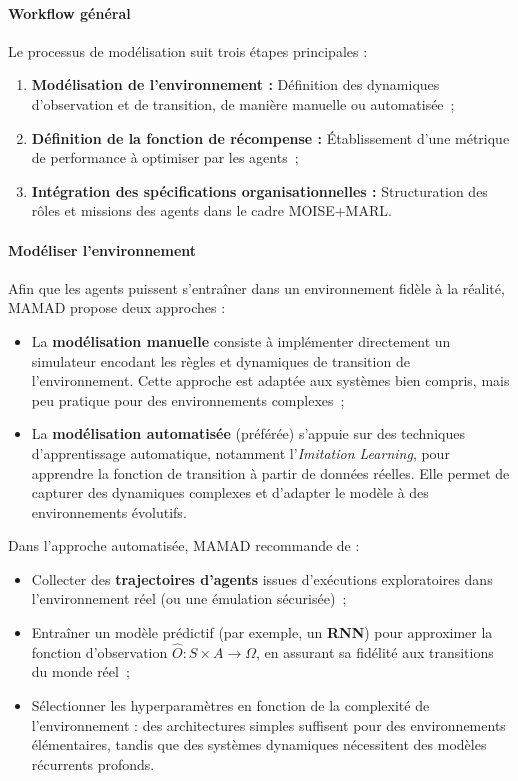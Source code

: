 \paragraph{Workflow général}

Le processus de modélisation suit trois étapes principales :
\begin{enumerate}
    \item \textbf{Modélisation de l'environnement :} Définition des dynamiques d'observation et de transition, de manière manuelle ou automatisée~;
    \item \textbf{Définition de la fonction de récompense :} Établissement d'une métrique de performance à optimiser par les agents~;
    \item \textbf{Intégration des spécifications organisationnelles :} Structuration des rôles et missions des agents dans le cadre MOISE+MARL.
\end{enumerate}

\paragraph{Modéliser l'environnement}

Afin que les agents puissent s'entraîner dans un environnement fidèle à la réalité, MAMAD propose deux approches :
\begin{itemize}
    \item La \textbf{modélisation manuelle} consiste à implémenter directement un simulateur encodant les règles et dynamiques de transition de l'environnement. Cette approche est adaptée aux systèmes bien compris, mais peu pratique pour des environnements complexes~;

    \item La \textbf{modélisation automatisée} (préférée) s'appuie sur des techniques d'apprentissage automatique, notamment l'\textit{Imitation Learning}, pour apprendre la fonction de transition à partir de données réelles. Elle permet de capturer des dynamiques complexes et d'adapter le modèle à des environnements évolutifs.
\end{itemize}

Dans l'approche automatisée, MAMAD recommande de :
\begin{itemize}
    \item Collecter des \textbf{trajectoires d'agents} issues d'exécutions exploratoires dans l'environnement réel (ou une émulation sécurisée)~;
    \item Entraîner un modèle prédictif (par exemple, un \textbf{RNN}) pour approximer la fonction d'observation $\hat{O}: S \times A \to \Omega$, en assurant sa fidélité aux transitions du monde réel~;
    \item Sélectionner les hyperparamètres en fonction de la complexité de l'environnement : des architectures simples suffisent pour des environnements élémentaires, tandis que des systèmes dynamiques nécessitent des modèles récurrents profonds.
\end{itemize}

